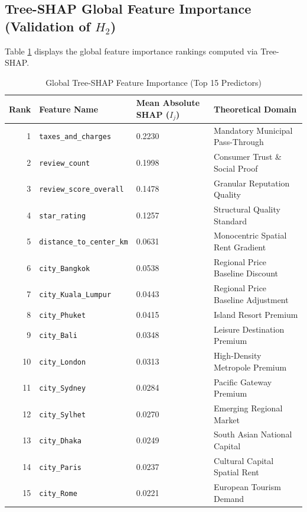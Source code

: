 \documentclass[11pt,a4paper]{article}
\begin{document}
\subsection{Tree-SHAP Global Feature Importance (Validation of $H_2$)}
Table \ref{tab:shap_importance} displays the global feature importance rankings computed via Tree-SHAP.

\begin{table}[htbp]
\centering
\small
\caption{Global Tree-SHAP Feature Importance (Top 15 Predictors)}
\label{tab:shap_importance}
\begin{tabular*}{\textwidth}{@{\extracolsep{\fill}}rlll@{}}
\toprule
\textbf{Rank} & \textbf{Feature Name} & \textbf{Mean Absolute SHAP ($I_j$)} & \textbf{Theoretical Domain} \\
\midrule
1  & \texttt{taxes\_and\_charges}     & 0.2230 & Mandatory Municipal Pass-Through \\
2  & \texttt{review\_count}           & 0.1998 & Consumer Trust \& Social Proof \\
3  & \texttt{review\_score\_overall}  & 0.1478 & Granular Reputation Quality \\
4  & \texttt{star\_rating}            & 0.1257 & Structural Quality Standard \\
5  & \texttt{distance\_to\_center\_km}& 0.0631 & Monocentric Spatial Rent Gradient \\
6  & \texttt{city\_Bangkok}           & 0.0538 & Regional Price Baseline Discount \\
7  & \texttt{city\_Kuala\_Lumpur}     & 0.0443 & Regional Price Baseline Adjustment \\
8  & \texttt{city\_Phuket}            & 0.0415 & Island Resort Premium \\
9  & \texttt{city\_Bali}              & 0.0348 & Leisure Destination Premium \\
10 & \texttt{city\_London}            & 0.0313 & High-Density Metropole Premium \\
11 & \texttt{city\_Sydney}            & 0.0284 & Pacific Gateway Premium \\
12 & \texttt{city\_Sylhet}            & 0.0270 & Emerging Regional Market \\
13 & \texttt{city\_Dhaka}             & 0.0249 & South Asian National Capital \\
14 & \texttt{city\_Paris}             & 0.0237 & Cultural Capital Spatial Rent \\
15 & \texttt{city\_Rome}              & 0.0221 & European Tourism Demand \\
\bottomrule
\end{tabular*}
\end{table}
\end{document}

